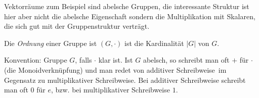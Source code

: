 \documentclass[10pt,a4paper]{article}
\begin{document}
Vektorräume zum Beispiel sind abelsche Gruppen, die interessante Struktur ist hier aber nicht die abelsche Eigenschaft sondern die Multiplikation mit Skalaren, die sich gut mit der Gruppenstruktur verträgt.\bigskip


Die \emph{Ordnung} einer Gruppe ist $(G, \cdot)$ ist die Kardinalität $\vert G \vert$ von $G$.\bigskip

Konvention: \glqq Gruppe $G$\grqq , falls $\cdot$ klar ist. Ist $G$ abelsch, so schreibt man oft $+$ für $\cdot$ (die Monoidverknüpfung) und man redet von \glqq additiver Schreibweise\grqq\ im Gegensatz zu \glqq multiplikativer Schreibweise\grqq . Bei additiver Schreibweise schreibt man oft $0$ für $e$, bzw. bei multiplikativer Schreibweise $1$.\bigskip
\end{document}
